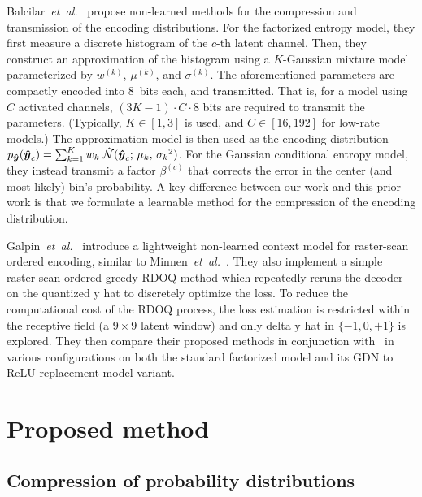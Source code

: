 Balcilar~\emph{et~al.}~\cite{balcilar2022amortizationgap} propose non-learned methods for the compression and transmission of the encoding distributions.
For the factorized entropy model, they first measure a discrete histogram of the $c$-th latent channel.
Then, they construct an approximation of the histogram using a $K$-Gaussian mixture model parameterized by $w^{(k)}$, $\mu^{(k)}$, and $\sigma^{(k)}$.
The aforementioned parameters are compactly encoded into 8~bits each, and transmitted.
That is, for a model using $C$ activated channels, $(3K - 1) \cdot C \cdot 8$ bits are required to transmit the parameters.
(Typically, $K \in [1, 3]$ is used, and $C \in [16, 192]$ for low-rate models.)
The approximation model is then used as the encoding distribution
$p_{{\boldsymbol{\hat{y}}}}({\boldsymbol{\hat{y}}}_c) = \sum_{k=1}^K w_k \; \mathcal{\hat{N}}({\boldsymbol{\hat{y}}}_c ; \, \mu_k, \, {\sigma_k}^2)$.
For the Gaussian conditional entropy model, they instead transmit a factor $\beta^{(c)}$ that corrects the error in the center (and most likely) bin's probability.
A key difference between our work and this prior work is that we formulate a learnable method for the compression of the encoding distribution.

Galpin~\emph{et~al.}~\cite{galpin2023entropy} introduce a lightweight non-learned context model for raster-scan ordered encoding, similar to Minnen~\emph{et~al.}~\cite{minnen2018joint}.
They also implement a simple raster-scan ordered greedy RDOQ method which repeatedly reruns the decoder on the quantized y hat to discretely optimize the loss.
To reduce the computational cost of the RDOQ process, the loss estimation is restricted within the receptive field (a $9 \times 9$ latent window) and only delta y hat in $\{-1, 0, +1\}$ is explored.
They then compare their proposed methods in conjunction with~\cite{campos2019content,balcilar2022amortizationgap} in various configurations on both the standard factorized model and its GDN to ReLU replacement model variant.

%




\section{Proposed method}

\subsection{Compression of probability distributions}

